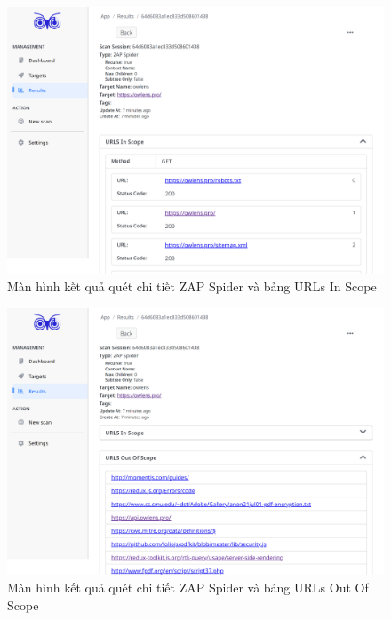 \begin{figure}[H]
      \centering
      \includegraphics[width=\textwidth]{applied-thesis-chapters/chapter-6/Màn hình kết quả quét chi tiết ZAP Spider và bảng URLs In Scope.png}
      \caption{Màn hình kết quả quét chi tiết ZAP Spider và bảng URLs In Scope}
      \label{fig:ManHinhKetQuaQuetChiTietSpiderVaURLsInScope}
\end{figure}

\begin{figure}[H]
      \centering
      \includegraphics[width=\textwidth]{applied-thesis-chapters/chapter-6/Màn hình kết quả quét chi tiết ZAP Spider và bảng URLs Out Of Scope.png}
      \caption{Màn hình kết quả quét chi tiết ZAP Spider và bảng URLs Out Of Scope}
      \label{fig:ManHinhKetQuaQuetChiTietSpiderVaURLsOutOfScope}
\end{figure}

